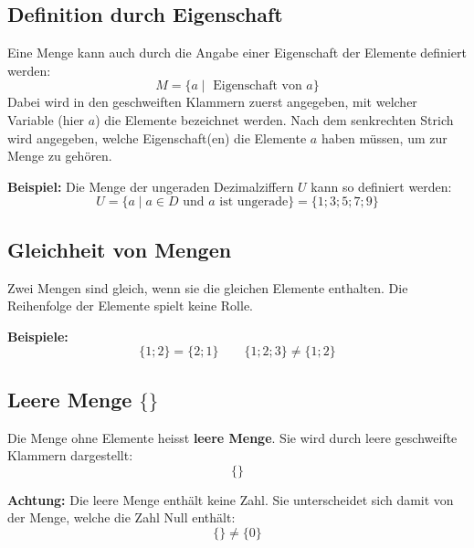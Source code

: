 \subsection{Definition durch Eigenschaft}

Eine Menge kann auch durch die Angabe einer Eigenschaft der Elemente definiert werden:
\[
  M = \{ a \mid \text{ Eigenschaft von } a\}
\]
Dabei wird in den geschweiften Klammern zuerst angegeben, mit welcher Variable (hier $a$) die Elemente bezeichnet werden. Nach dem senkrechten Strich wird angegeben, welche Eigenschaft(en) die Elemente $a$ haben müssen, um zur Menge zu gehören.
\begin{example}
  \textbf{Beispiel:} Die Menge der ungeraden Dezimalziffern $U$ kann so definiert werden:
  \[
    U = \{ a \mid a \in D \text{ und } a \text{ ist ungerade} \} = \{ 1; 3; 5; 7; 9 \}
  \]
\end{example}

\subsection{Gleichheit von Mengen}
Zwei Mengen sind gleich, wenn sie die gleichen Elemente enthalten. Die Reihenfolge der Elemente spielt keine Rolle.
\begin{example}
  \textbf{Beispiele:}
  \[
    \{1;2\} = \{2;1\} \qquad \{1;2;3\} \neq \{1;2\}
  \]
\end{example}

\subsection{Leere Menge $\{\}$}
Die Menge ohne Elemente heisst \textbf{leere Menge}. Sie wird durch leere geschweifte Klammern dargestellt:
\[
  \{ \}
\]
\begin{note}
  \textbf{Achtung:} Die leere Menge enthält keine Zahl. Sie unterscheidet sich damit von der Menge, welche die Zahl Null enthält:
  \[
    \{\} \neq \{0\}
  \]
\end{note}

